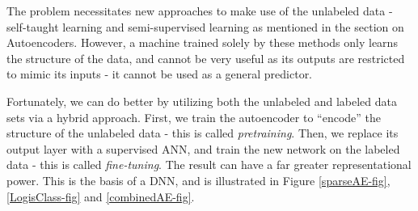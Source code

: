 \documentclass[12pt]{article}  %
\begin{document}
The problem necessitates new approaches to make use of the unlabeled data - self-taught learning and semi-supervised learning as mentioned in the section on Autoencoders. However, a machine trained solely by these methods only learns the structure of the data, and cannot be very useful as its outputs are restricted to mimic its inputs - it cannot be used as a general predictor.

Fortunately, we can do better by utilizing both the unlabeled and labeled data sets via a hybrid approach. First, we train the autoencoder to ``encode'' the structure of the unlabeled data - this is called \emph{pretraining}. Then, we replace its output layer with a supervised ANN, and train the new network on the labeled data - this is called \emph{fine-tuning}. The result can have a far greater representational power. This is the basis of a DNN, and is illustrated in Figure \ref{sparseAE-fig}, \ref{LogisClass-fig} and \ref{combinedAE-fig}.
\end{document}

